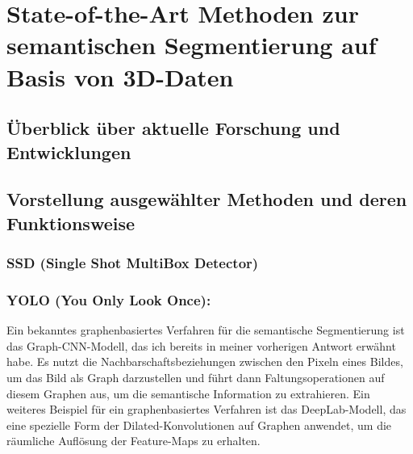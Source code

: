 \chapter{State-of-the-Art Methoden zur semantischen Segmentierung auf Basis von 3D-Daten}
\section{Überblick über aktuelle Forschung und Entwicklungen}
\section{Vorstellung ausgewählter Methoden und deren Funktionsweise}
\subsection{SSD (Single Shot MultiBox Detector)}
\subsection{YOLO (You Only Look Once):}

Ein bekanntes graphenbasiertes Verfahren für die semantische Segmentierung ist
das Graph-CNN-Modell, das ich bereits in meiner vorherigen Antwort erwähnt
habe. Es nutzt die Nachbarschaftsbeziehungen zwischen den Pixeln eines Bildes,
um das Bild als Graph darzustellen und führt dann Faltungsoperationen auf
diesem Graphen aus, um die semantische Information zu extrahieren. Ein weiteres
Beispiel für ein graphenbasiertes Verfahren ist das DeepLab-Modell, das eine
spezielle Form der Dilated-Konvolutionen auf Graphen anwendet, um die räumliche
Auflösung der Feature-Maps zu erhalten.